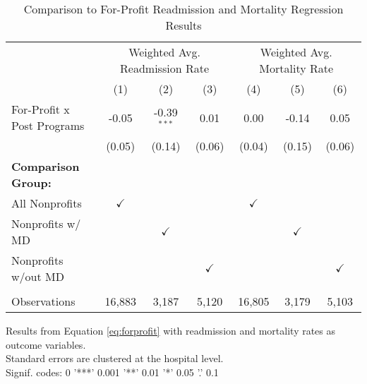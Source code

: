 \begin{table}[ht!]
   \caption{\label{tab:forprofit_readmort_fullsample} Comparison to For-Profit Readmission and Mortality Regression Results}
   \bigskip
   \centering
   \begin{tabular}{lcccccc}
      \toprule
       & \multicolumn{3}{c}{Weighted Avg. Readmission Rate} & \multicolumn{3}{c}{Weighted Avg. Mortality Rate}\\
                                  & (1)           & (2)           & (3)           & (4)           & (5)           & (6)\\  
      \midrule 
      For-Profit x Post Programs  & -0.05         & -0.39$^{***}$ & 0.01          & 0.00          & -0.14         & 0.05\\   
                                  & (0.05)        & (0.14)        & (0.06)        & (0.04)        & (0.15)        & (0.06)\\   
      \textbf{Comparison Group:}  &               &               &               &               &               & \\  
      All Nonprofits              & $\checkmark$  &               &               & $\checkmark$  &               & \\  
      Nonprofits w/ MD            &               & $\checkmark$  &               &               & $\checkmark$  & \\  
      Nonprofits w/out MD         &               &               & $\checkmark$  &               &               & $\checkmark$\\   
       \\
      Observations                & 16,883        & 3,187         & 5,120         & 16,805        & 3,179         & 5,103\\  
      \bottomrule
   \end{tabular}
   
   \par \raggedright 
   Results from Equation \ref{eq:forprofit} with readmission and mortality rates as outcome variables.\\
   Standard errors are clustered at the hospital level.\\
   Signif. codes: 0 '***' 0.001 '**' 0.01 '*' 0.05 '.' 0.1
\end{table}
